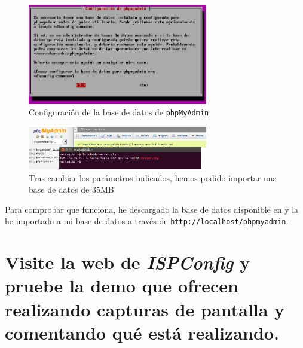 \documentclass[10pt,a4paper,spanish]{article}
\numberwithin{equation}{section} %
\numberwithin{figure}{section} %
\numberwithin{table}{section} %
\begin{document}
\begin{figure}[!h]
    \centering
    \includegraphics[width=0.7\textwidth]{35}
    \caption{Configuración de la base de datos de \texttt{phpMyAdmin}}
    \label{bdphpmyadmin}
\end{figure}

\begin{figure}[!h]
    \centering
    \includegraphics[width=0.7\textwidth]{36}
    \caption{Tras cambiar los parámetros indicados, hemos podido importar una base de datos de 35MB}
    \label{postmaxsize}
\end{figure}

Para comprobar que funciona, he descargado la base de datos disponible en \cite{testdb} y la he importado a mi base de datos a través de \texttt{http://localhost/phpmyadmin}.

\section{Visite la web de \textit{ISPConfig} y pruebe la demo que ofrecen realizando capturas de pantalla y comentando qué está realizando.}
\end{document}
